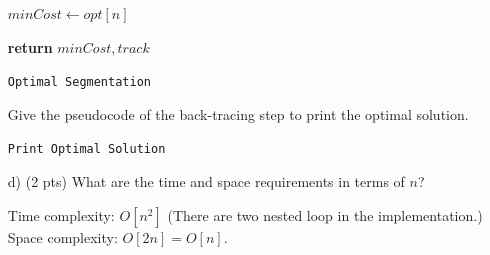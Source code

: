 \documentclass{article}
\begin{document}
\begin{itemize}
\begin{center}
\begin{minipage}{0.8\linewidth}
{\begin{algorithm}[H]
			\bigskip

				
			\bigskip
			$minCost \leftarrow opt[n]$
			\bigskip
			
			{\bf return} $minCost, track$
			\caption{\texttt{Optimal Segmentation}} %
			\label{alg1}   %
		\end{algorithm}
		}
	\end{minipage}
\end{center}

Give the pseudocode of the back-tracing step to print the optimal solution.
\begin{center}
	\begin{minipage}{0.7\linewidth} %
		\begin{algorithm}[H]

			\bigskip
			
			
			\caption{\texttt{Print Optimal Solution}} %
			\label{alg1}   %
		\end{algorithm}
	\end{minipage}
\end{center}


\item[d)] (2 pts) What are the time and space requirements in terms of $n$?

Time complexity: $O[n^2]$ (There are two nested loop in the implementation.)\\
Space complexity: $O[2n] = O[n]$.
\end{itemize}
\color{black}
\newpage
\end{document}
